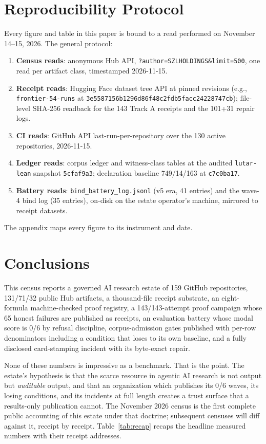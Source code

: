 ﻿\documentclass[11pt]{article}
\begin{document}
\section{Reproducibility Protocol}
\label{sec:repro}

Every figure and table in this paper is bound to a read performed on November 14--15, 2026. The general protocol:
\begin{enumerate}
\item \textbf{Census reads}: anonymous Hub API, \texttt{?author=SZLHOLDINGS\&limit=500}, one read per artifact class, timestamped 2026-11-15.
\item \textbf{Receipt reads}: Hugging Face dataset tree API at pinned revisions (e.g., \texttt{frontier-54-runs} at \texttt{3e5587156b1296d86f48c2fdb5facc24228747cb}); file-level SHA-256 readback for the 143 Track A receipts and the 101+31 repair logs.
\item \textbf{CI reads}: GitHub API last-run-per-repository over the 130 active repositories, 2026-11-15.
\item \textbf{Ledger reads}: corpus ledger and witness-class tables at the audited \texttt{lutar-lean} snapshot \texttt{5cfaf9a3}; declaration baseline 749/14/163 at \texttt{c7c0ba17}.
\item \textbf{Battery reads}: \texttt{bind\_battery\_log.jsonl} (v5 era, 41 entries) and the wave-4 bind log (35 entries), on-disk on the estate operator's machine, mirrored to receipt datasets.
\end{enumerate}
The appendix maps every figure to its instrument and date.

\section{Conclusions}
\label{sec:concl}

This census reports a governed AI research estate of 159 GitHub repositories, 131/71/32 public Hub artifacts, a thousand-file receipt substrate, an eight-formula machine-checked proof registry, a 143/143-attempt proof campaign whose 65 honest failures are published as receipts, an evaluation battery whose modal score is 0/6 by refusal discipline, corpus-admission gates published with per-row denominators including a condition that loses to its own baseline, and a fully disclosed card-stamping incident with its byte-exact repair.

None of these numbers is impressive as a benchmark. That is the point. The estate's hypothesis is that the scarce resource in agentic AI research is not output but \emph{auditable} output, and that an organization which publishes its 0/6 waves, its losing conditions, and its incidents at full length creates a trust surface that a results-only publication cannot. The November 2026 census is the first complete public accounting of this estate under that doctrine; subsequent censuses will diff against it, receipt by receipt. Table~\ref{tab:recap} recaps the headline measured numbers with their receipt addresses.
\end{document}
